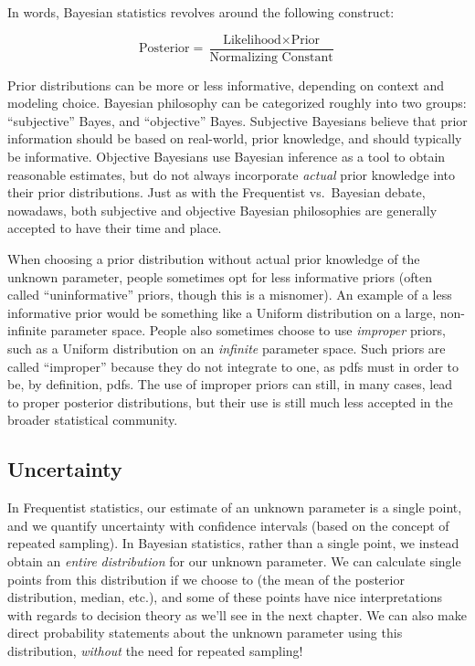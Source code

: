 \documentclass[
  letterpaper,
  DIV=11,
  numbers=noendperiod]{scrreprt}
\begin{document}
In words, Bayesian statistics revolves around the following construct:

\[
\text{Posterior} = \frac{\text{Likelihood} \times \text{Prior}}{\text{Normalizing Constant}}
\]

Prior distributions can be more or less informative, depending on
context and modeling choice. Bayesian philosophy can be categorized
roughly into two groups: ``subjective'' Bayes, and ``objective'' Bayes.
Subjective Bayesians believe that prior information should be based on
real-world, prior knowledge, and should typically be informative.
Objective Bayesians use Bayesian inference as a tool to obtain
reasonable estimates, but do not always incorporate \emph{actual} prior
knowledge into their prior distributions. Just as with the Frequentist
vs.~Bayesian debate, nowadaws, both subjective and objective Bayesian
philosophies are generally accepted to have their time and place.

When choosing a prior distribution without actual prior knowledge of the
unknown parameter, people sometimes opt for less informative priors
(often called ``uninformative'' priors, though this is a misnomer). An
example of a less informative prior would be something like a Uniform
distribution on a large, non-infinite parameter space. People also
sometimes choose to use \emph{improper} priors, such as a Uniform
distribution on an \emph{infinite} parameter space. Such priors are
called ``improper'' because they do not integrate to one, as pdfs must
in order to be, by definition, pdfs. The use of improper priors can
still, in many cases, lead to proper posterior distributions, but their
use is still much less accepted in the broader statistical community.

\subsection*{Uncertainty}\label{uncertainty}

In Frequentist statistics, our estimate of an unknown parameter is a
single point, and we quantify uncertainty with confidence intervals
(based on the concept of repeated sampling). In Bayesian statistics,
rather than a single point, we instead obtain an \emph{entire}
\emph{distribution} for our unknown parameter. We can calculate single
points from this distribution if we choose to (the mean of the posterior
distribution, median, etc.), and some of these points have nice
interpretations with regards to decision theory as we'll see in the next
chapter. We can also make direct probability statements about the
unknown parameter using this distribution, \emph{without} the need for
repeated sampling!
\end{document}
